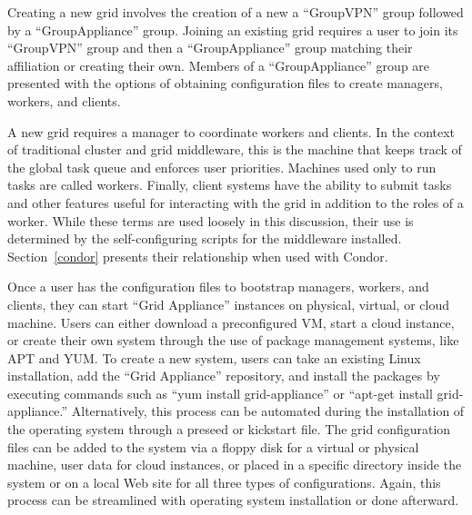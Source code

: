 \documentclass[conference]{IEEEtran}
\begin{document}
Creating a new grid involves the creation of a new a ``GroupVPN'' group
followed by a ``GroupAppliance'' group.  Joining an existing grid requires a
user to join its ``GroupVPN'' group and then a ``GroupAppliance'' group
matching their affiliation or creating their own.  Members of a
``GroupAppliance'' group are presented with the options of obtaining
configuration files to create managers, workers, and clients.

A new grid requires a manager to coordinate workers and clients.  In the
context of traditional cluster and grid middleware, this is the machine that
keeps track of the global task queue and enforces user priorities.  Machines
used only to run tasks are called workers.  Finally, client systems have the
ability to submit tasks and other features useful for interacting with the grid
in addition to the roles of a worker.  While these terms are used loosely in
this discussion, their use is determined by the self-configuring scripts for
the middleware installed.  Section~\ref{condor} presents their relationship
when used with Condor.

Once a user has the configuration files to bootstrap managers, workers, and
clients, they can start ``Grid Appliance'' instances  on physical, virtual, or
cloud machine.  Users can either download a preconfigured VM, start a cloud
instance, or create their own system through the use of package management
systems, like APT and YUM.  To create a new system, users can take an existing
Linux installation, add the ``Grid Appliance'' repository, and install the
packages by executing commands such as ``yum install grid-appliance'' or
``apt-get install grid-appliance.'' Alternatively, this process can be
automated during the installation of the operating system through a preseed or
kickstart file.  The grid configuration files can be added to the system via a
floppy disk for a virtual or physical machine, user data for cloud instances,
or placed in a specific directory inside the system or on a local Web site for
all three types of configurations.  Again, this process can be streamlined with
operating system installation or done afterward.  
 
\end{document}
